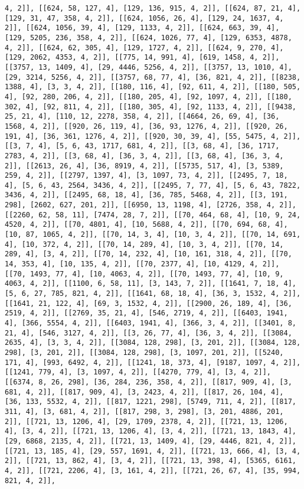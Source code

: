 \documentclass[12pt,fleqn]{article}\usepackage{../../common}
\begin{document}
\begin{verbatim}
4, 2]], [[624, 58, 127, 4], [129, 136, 915, 4, 2]], [[624, 87, 21, 4], [129, 31, 47, 358, 4, 2]], [[624, 1056, 26, 4], [129, 24, 1637, 4, 2]], [[624, 1056, 39, 4], [129, 1133, 4, 2]], [[624, 663, 39, 4], [129, 5205, 236, 358, 4, 2]], [[624, 1026, 77, 4], [129, 6353, 4878, 4, 2]], [[624, 62, 305, 4], [129, 1727, 4, 2]], [[624, 9, 270, 4], [129, 2062, 4353, 4, 2]], [[775, 14, 991, 4], [619, 1458, 4, 2]], [[3757, 13, 1409, 4], [29, 4446, 5256, 4, 2]], [[3757, 13, 1010, 4], [29, 3214, 5256, 4, 2]], [[3757, 68, 77, 4], [36, 821, 4, 2]], [[8238, 1388, 4], [3, 3, 4, 2]], [[180, 116, 4], [92, 611, 4, 2]], [[180, 505, 4], [92, 280, 206, 4, 2]], [[180, 205, 4], [92, 1097, 4, 2]], [[180, 302, 4], [92, 811, 4, 2]], [[180, 305, 4], [92, 1133, 4, 2]], [[9438, 25, 21, 4], [110, 12, 2278, 358, 4, 2]], [[4664, 26, 69, 4], [36, 1568, 4, 2]], [[920, 26, 119, 4], [36, 93, 1276, 4, 2]], [[920, 26, 191, 4], [36, 361, 1276, 4, 2]], [[920, 30, 39, 4], [55, 5475, 4, 2]], [[3, 7, 4], [5, 6, 43, 1717, 681, 4, 2]], [[3, 68, 4], [36, 1717, 2783, 4, 2]], [[3, 68, 4], [36, 3, 4, 2]], [[3, 68, 4], [36, 3, 4, 2]], [[2613, 26, 4], [36, 8919, 4, 2]], [[5735, 517, 4], [3, 5389, 259, 4, 2]], [[2797, 1397, 4], [3, 1097, 73, 4, 2]], [[2495, 7, 18, 4], [5, 6, 43, 2564, 3436, 4, 2]], [[2495, 7, 77, 4], [5, 6, 43, 7822, 3436, 4, 2]], [[2495, 68, 18, 4], [36, 785, 5468, 4, 2]], [[3, 191, 298], [2602, 627, 201, 2]], [[6950, 13, 1198, 4], [2726, 358, 4, 2]], [[2260, 62, 58, 11], [7474, 28, 7, 2]], [[70, 464, 68, 4], [10, 9, 24, 4520, 4, 2]], [[70, 4801, 4], [10, 5688, 4, 2]], [[70, 694, 68, 4], [10, 87, 1065, 4, 2]], [[70, 14, 3, 4], [10, 3, 4, 2]], [[70, 14, 691, 4], [10, 372, 4, 2]], [[70, 14, 289, 4], [10, 3, 4, 2]], [[70, 14, 289, 4], [3, 4, 2]], [[70, 14, 232, 4], [10, 161, 318, 4, 2]], [[70, 14, 353, 4], [10, 135, 4, 2]], [[70, 2377, 4], [10, 4129, 4, 2]], [[70, 1493, 77, 4], [10, 4063, 4, 2]], [[70, 1493, 77, 4], [10, 9, 4063, 4, 2]], [[1100, 6, 58, 11], [3, 143, 7, 2]], [[1641, 7, 18, 4], [5, 6, 27, 785, 821, 4, 2]], [[1641, 68, 18, 4], [36, 3, 1532, 4, 2]], [[1641, 21, 122, 4], [69, 3, 1532, 4, 2]], [[2900, 26, 189, 4], [36, 2519, 4, 2]], [[2769, 35, 21, 4], [546, 2719, 4, 2]], [[6403, 1941, 4], [366, 5554, 4, 2]], [[6403, 1941, 4], [366, 3, 4, 2]], [[3401, 8, 21, 4], [546, 3127, 4, 2]], [[3, 26, 77, 4], [36, 3, 4, 2]], [[3084, 2635, 4], [3, 3, 4, 2]], [[3084, 128, 298], [3, 201, 2]], [[3084, 128, 298], [3, 201, 2]], [[3084, 128, 298], [3, 1097, 201, 2]], [[5240, 171, 4], [993, 6492, 4, 2]], [[1241, 18, 373, 4], [9187, 1097, 4, 2]], [[1241, 779, 4], [3, 1097, 4, 2]], [[4270, 779, 4], [3, 4, 2]], [[6374, 8, 26, 298], [36, 284, 236, 358, 4, 2]], [[817, 909, 4], [3, 681, 4, 2]], [[817, 909, 4], [3, 2423, 4, 2]], [[817, 26, 104, 4], [36, 133, 5532, 4, 2]], [[817, 1221, 298], [5749, 711, 4, 2]], [[817, 311, 4], [3, 681, 4, 2]], [[817, 298, 3, 298], [3, 201, 4886, 201, 2]], [[721, 13, 1206, 4], [29, 1709, 2378, 4, 2]], [[721, 13, 1206, 4], [3, 4, 2]], [[721, 13, 1206, 4], [3, 4, 2]], [[721, 13, 1843, 4], [29, 6868, 2135, 4, 2]], [[721, 13, 1409, 4], [29, 4446, 821, 4, 2]], [[721, 13, 185, 4], [29, 557, 1691, 4, 2]], [[721, 13, 666, 4], [3, 4, 2]], [[721, 13, 862, 4], [3, 4, 2]], [[721, 13, 398, 4], [5365, 6161, 4, 2]], [[721, 2206, 4], [3, 161, 4, 2]], [[721, 26, 67, 4], [35, 994, 821, 4, 2]], 
\end{verbatim}
\end{document}
